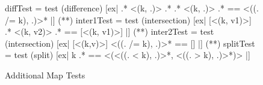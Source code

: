 \begin{figure}
\begin{smallhskcode}
diffTest = test (difference)
    [ex| { .* <(k, .)> .* } { .* <(k, .)> .* } == { <((. /= k), .)>* } |]
(*\vspace{-0.7em}*)
inter1Test = test (intersection)
    [ex| { [<(k, v1)>] } { .* <(k, v2)> .* } == { [<(k, v1)>] } |]
(*\vspace{-0.7em}*)
inter2Test = test (intersection)
      [ex| { [<(k,v)>] } { <((. /= k), .)>* } == [] |]
(*\vspace{-0.7em}*)
splitTest = test (split)
    [ex| k { .* } == { <(<((. < k), .)>*, <((. > k), .)>*)> } |]
\end{smallhskcode}
\caption{Additional Map Tests}
\label{fig:additional-map}
\end{figure}